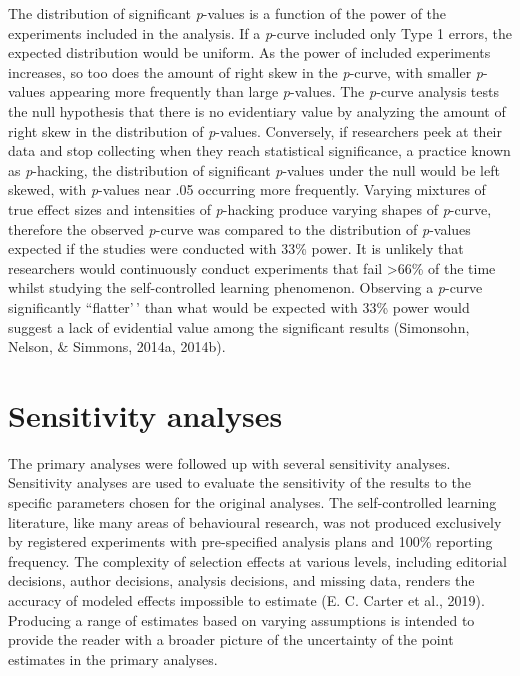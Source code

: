 \documentclass[
  english,
  man,floatsintext]{apa7}
\begin{document}
The distribution of significant \emph{p}-values is a function of the power of the experiments included in the analysis. If a \emph{p}-curve included only Type 1 errors, the expected distribution would be uniform. As the power of included experiments increases, so too does the amount of right skew in the \emph{p}-curve, with smaller \emph{p}-values appearing more frequently than large \emph{p}-values. The \emph{p}-curve analysis tests the null hypothesis that there is no evidentiary value by analyzing the amount of right skew in the distribution of \emph{p}-values. Conversely, if researchers peek at their data and stop collecting when they reach statistical significance, a practice known as \emph{p}-hacking, the distribution of significant \emph{p}-values under the null would be left skewed, with \emph{p}-values near .05 occurring more frequently. Varying mixtures of true effect sizes and intensities of \emph{p}-hacking produce varying shapes of \emph{p}-curve, therefore the observed \emph{p}-curve was compared to the distribution of \emph{p}-values expected if the studies were conducted with 33\% power. It is unlikely that researchers would continuously conduct experiments that fail \textgreater66\% of the time whilst studying the self-controlled learning phenomenon. Observing a \emph{p}-curve significantly ``flatter'\,' than what would be expected with 33\% power would suggest a lack of evidential value among the significant results (Simonsohn, Nelson, \& Simmons, 2014a, 2014b).

\hypertarget{sensitivity-analyses}{%
\section{Sensitivity analyses}\label{sensitivity-analyses}}

The primary analyses were followed up with several sensitivity analyses. Sensitivity analyses are used to evaluate the sensitivity of the results to the specific parameters chosen for the original analyses. The self-controlled learning literature, like many areas of behavioural research, was not produced exclusively by registered experiments with pre-specified analysis plans and 100\% reporting frequency. The complexity of selection effects at various levels, including editorial decisions, author decisions, analysis decisions, and missing data, renders the accuracy of modeled effects impossible to estimate (E. C. Carter et al., 2019). Producing a range of estimates based on varying assumptions is intended to provide the reader with a broader picture of the uncertainty of the point estimates in the primary analyses.
\end{document}
